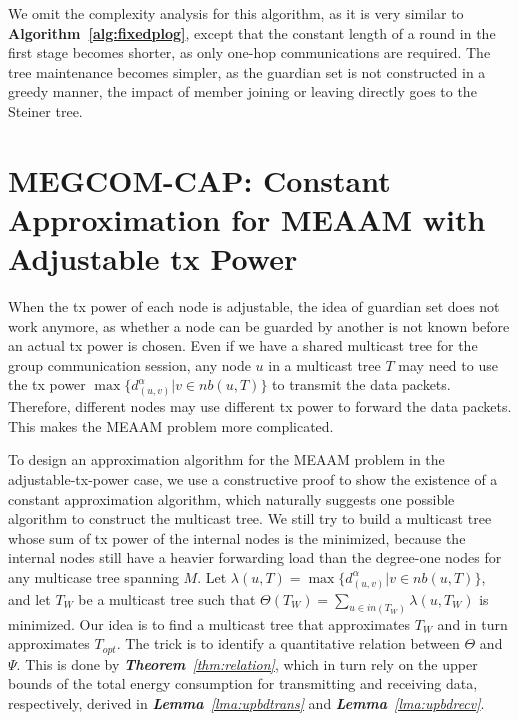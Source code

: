\documentclass[10pt, conference, compsocconf]{IEEEtran}
\begin{document}
    We omit the complexity analysis for this algorithm, as it is very similar to \textbf{Algorithm~\ref{alg:fixedplog}}, except that the constant length of a round in the first stage becomes shorter, as only one-hop communications are required. The tree maintenance becomes simpler, as the guardian set is not constructed in a greedy manner, the impact of member joining or leaving directly goes to the Steiner tree.


\section{MEGCOM-CAP: Constant Approximation for MEAAM with Adjustable tx Power} \label{sec:conatxp}
When the tx power of each node is adjustable, the idea of guardian set does not work anymore, as whether a node can be guarded by another is not known before an actual tx power is chosen. Even if we have a shared multicast tree for the group communication session, any node $u$ in a multicast tree $T$ may need to use the tx power $\max\{d_{(u,v)}^\alpha |v \in \mathit{nb}(u,T)\}$ to transmit the data packets. Therefore, different nodes may use different tx power to forward the data packets. This makes the MEAAM problem more complicated.

  To design an approximation algorithm for the MEAAM problem in the adjustable-tx-power case, we use a constructive proof to show the existence of a constant approximation algorithm, which naturally suggests one possible algorithm to construct the multicast tree. We still try to build a multicast tree whose sum of tx power of the internal nodes is the minimized, because the internal nodes still have a heavier forwarding load than the degree-one nodes for any multicase tree spanning $M$. Let $\lambda(u,T) = \max\{d_{(u,v)}^\alpha |v \in \mathit{nb}(u,T)\}$, and let $T_W$ be a multicast tree such that $\Theta ({T_W}) = \sum_{u \in \mathit{in}({T_W})} {\lambda (u,{T_W})}$ is minimized. Our idea is to find a multicast tree that approximates $T_W$ and in turn approximates $T_\mathit{opt}$. The trick is to identify a quantitative relation between $\Theta$ and $\Psi$. This is done by \textit{\textbf{Theorem}~\ref{thm:relation}}, which in turn rely on the upper bounds of the total energy consumption for transmitting and receiving data, respectively, derived in \textit{\textbf{Lemma}~\ref{lma:upbdtrans}} and \textit{\textbf{Lemma}~\ref{lma:upbdrecv}}.
\end{document}
